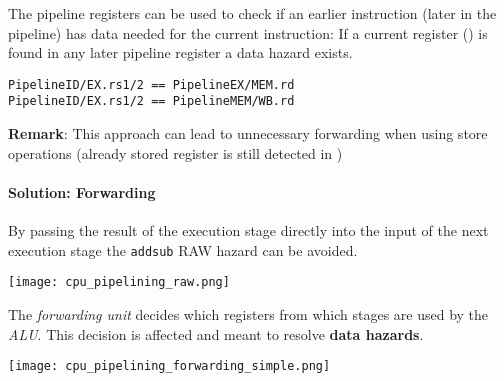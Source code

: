    \newpar{}

    The pipeline registers can be used to check if an earlier instruction (later in the pipeline) has data needed for the current instruction:
    If a current  register () is found in any later pipeline register a data hazard exists.
    \begin{lstlisting}
PipelineID/EX.rs1/2 == PipelineEX/MEM.rd
PipelineID/EX.rs1/2 == PipelineMEM/WB.rd
    \end{lstlisting}
    \textbf{Remark}: This approach can lead to unnecessary forwarding when using store operations (already stored register is still detected in )

    \paragraph{Solution: Forwarding}
    By passing the result of the execution stage directly into the input of the next execution stage the \texttt{add}\textleftarrow\texttt{sub} RAW hazard can be avoided.

    \texttt{[image: cpu\_pipelining\_raw.png]}

    The \textit{forwarding unit} decides which registers from which stages are used by the \textit{ALU}. This decision is affected and meant to resolve \textbf{data hazards}.

    \begin{center}
        \texttt{[image: cpu\_pipelining\_forwarding\_simple.png]}
    \end{center}

